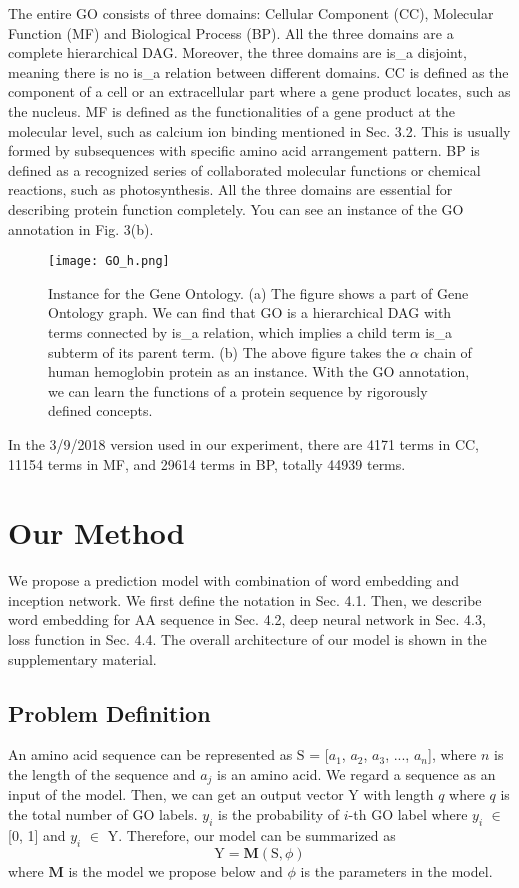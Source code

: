 \documentclass{article}
\begin{document}
        The entire GO consists of three domains: Cellular Component (CC), Molecular Function (MF) and Biological Process (BP). All the three domains are a complete hierarchical DAG. Moreover, the three domains are is\_a disjoint, meaning there is no is\_a relation between different domains. CC is defined as the component of a cell or an extracellular part where a gene product locates, such as the nucleus. MF is defined as the functionalities of a gene product at the molecular level, such as calcium ion binding mentioned in Sec. 3.2. This is usually formed by subsequences with specific amino acid arrangement pattern. BP is defined as a recognized series of collaborated molecular functions or chemical reactions, such as photosynthesis. All the three domains are essential for describing protein function completely. You can see an instance of the GO annotation in Fig. 3(b).  \par
        \begin{figure}[h]
        	\texttt{[image: GO\_h.png]}
        	\centering
        	\caption{Instance for the Gene Ontology. (a) The figure shows a part of Gene Ontology graph. We can find that GO is a hierarchical DAG with terms connected by is\_a relation, which implies a child term is\_a subterm of its parent term. (b) The above figure takes the $\alpha$ chain of human hemoglobin protein as an instance. With the GO annotation, we can learn the functions of a protein sequence by rigorously defined concepts.}
        \end{figure}
        In the 3/9/2018 version used in our experiment, there are 4171 terms in CC, 11154 terms in MF, and 29614 terms in BP, totally 44939 terms. 

\section{Our Method}
    We propose a prediction model with combination of word embedding and inception network. We first define the notation in Sec. 4.1. Then, we describe word embedding for AA sequence in Sec. 4.2, deep neural network in Sec. 4.3, loss function in Sec. 4.4. The overall architecture of our model is shown in the supplementary material.

    \subsection{Problem Definition}
        An amino acid sequence can be represented as $\mbox{S}$ = [$a_{1}$, $a_{2}$, $a_{3}$, ..., $a_{n}$], where $n$ is the length of the sequence and $a_{j}$ is an amino acid. We regard a sequence as an input of the model. Then, we can get an output vector $\mbox{Y}$ with length $q$ where $q$ is the total number of GO labels. $y_{i}$ is the probability of $i$-th GO label where $y_{i}$ $\in$ [0, 1] and $y_{i}$ $\in$ $\mbox{Y}$. Therefore, our model can be summarized as
        \begin{equation}
        \mbox{Y} = \mathbf{M}(\mbox{S}, {\phi})
        \end{equation}
        where $\mathbf{M}$ is the model we propose below and ${\phi}$ is the parameters in the model. 
\end{document}
